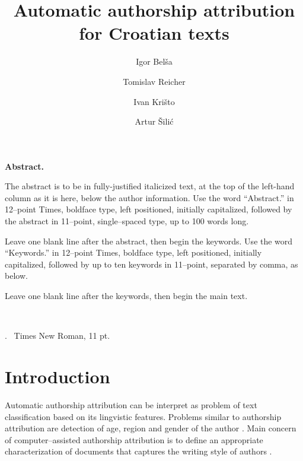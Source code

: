 \documentclass[11pt,english]{article}
\let\LaTeXtitle\title
\renewcommand{\title}[1]{\LaTeXtitle{\Large \textbf{#1}}}
\renewenvironment{abstract}
{\noindent \large \bf Abstract. \normalsize \begin{it}}
{\end{it}\\}
\newenvironment{keywords}
{\noindent {\large {\bf Keywords}}.~}{}
\begin{document}
\title{Automatic authorship attribution for Croatian texts}
\author{Igor Belša}
\author{Tomislav Reicher}
\author{Ivan Krišto}
\author{Artur Šilić}

\date{}

\maketitle

\thispagestyle{empty}
\pagestyle{empty}
\begin{multicols}{2}



\begin{abstract}
The abstract is to be in fully-justified italicized text, at the top of the
left-hand column as it is here, below the author information. Use the word
``Abstract.'' in 12--point Times, boldface type, left positioned, initially
capitalized, followed by the abstract in 11--point, single--spaced type, up to
100 words long.

Leave one blank line after the abstract, then begin the keywords. Use
the word ``Keywords.'' in 12--point Times, boldface type, left positioned,
initially capitalized, followed by up to ten keywords in 11--point, separated
by comma, as below.

Leave one blank line after the keywords, then begin the main text.
\end{abstract}

\begin{keywords}
Times New Roman, 11 pt.
\end{keywords}

\section{Introduction}
Automatic authorship attribution can be interpret as problem of text
classification based on its lingvistic features. Problems similar to authorship
attribution are detection of age, region and gender of the author
\citep{luyckx2005shallow}. Main concern of computer--assisted authorship
attribution is to define an appropriate characterization of documents that
captures the writing style of authors \citep{coyotl2006authorship}.


\end{multicols}
\end{document}
